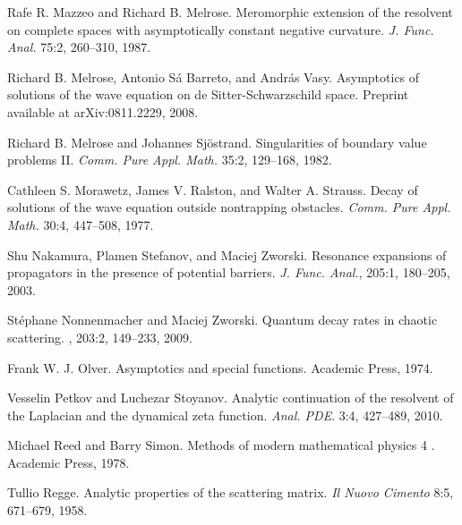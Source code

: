 \documentclass[reqno, 12pt]{amsart}
\theoremstyle{definition}
\numberwithin{equation}{section}
\numberwithin{prop}{section}
\numberwithin{figure}{section}
\begin{document}
\begin{thebibliography}{00}
  Rafe R. Mazzeo and Richard B. Melrose. Meromorphic extension of the resolvent on complete spaces with asymptotically constant negative curvature. \textit{J. Func. Anal.} 75:2, 260--310, 1987.

 Richard B. Melrose, Antonio S{\'a} Barreto, and Andr\'as Vasy. \newblock Asymptotics of solutions of the wave equation on de Sitter-Schwarzschild space. \newblock Preprint available at arXiv:0811.2229, 2008.

 Richard B. Melrose and Johannes Sj\"ostrand. Singularities of boundary value problems II. \textit{Comm. Pure Appl. Math.} 35:2, 129--168, 1982.

 Cathleen S. Morawetz, James V. Ralston, and Walter A. Strauss. Decay of solutions of the wave equation outside nontrapping obstacles. \textit{Comm. Pure Appl. Math.} 30:4, 447--508, 1977.

 Shu Nakamura, Plamen Stefanov, and Maciej Zworski. Resonance expansions of propagators in the presence of potential barriers. \textit{J. Func. Anal.}, 205:1, 180--205, 2003.

 St{\'e}phane Nonnenmacher and Maciej Zworski.
\newblock Quantum decay rates in chaotic scattering.
, 203:2, 149--233, 2009.

 Frank W. J. Olver. Asymptotics and special functions. Academic Press, 1974.

 Vesselin Petkov and Luchezar Stoyanov. Analytic continuation of the resolvent of the Laplacian and the dynamical zeta function. \textit{Anal. PDE}.  3:4, 427--489, 2010.


 Michael Reed and Barry Simon. Methods of modern mathematical physics 4%
. Academic Press, 1978.

 Tullio Regge. Analytic properties of the scattering matrix.
\textit{Il Nuovo Cimento}
8:5, 671--679, 1958.



\end{thebibliography}
\end{document}
